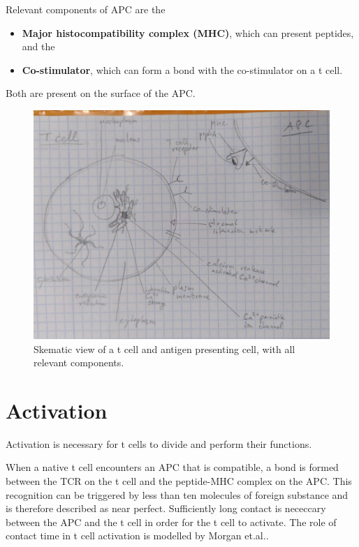 Relevant components of APC are the
\begin{itemize}
	\item \textbf{Major histocompatibility complex (MHC)}, which can present peptides, and the
	\item \textbf{Co-stimulator}, which can form a bond with the co-stimulator on a t cell.
\end{itemize}

Both are present on the surface of the APC.

\begin{figure}
	\centering
	\includegraphics[width=\linewidth]{fig/tmp_t_cell_components}
	\caption{Skematic view of a t cell and antigen presenting cell, with all relevant components.}
	\label{fig:tcellcomponents}
\end{figure}

\section{Activation}

Activation is necessary for t cells to divide and perform their functions.\cite{Ganong1997}

When a native t cell encounters an APC that is compatible, a bond is formed between the TCR on the t cell and the peptide-MHC complex on the APC. This recognition can be triggered by less than ten molecules of foreign substance and is therefore described as near perfect. Sufficiently long contact is nececcary between the APC and the t cell in order for the t cell to activate. The role of contact time in t cell activation is modelled by Morgan et.al.\cite{morgan2023}.

